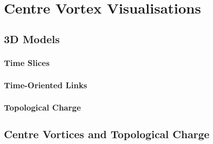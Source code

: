 
\chapter{Centre Vortex Visualisations}
\section{3D Models}
\subsection{Time Slices}
\subsection{Time-Oriented Links}
\subsection{Topological Charge}
\section{Centre Vortices and Topological Charge}

\ifpdf
    \graphicspath{{Chapter7/Figs/Raster/}{Chapter7/Figs/PDF/}{Chapter7/Figs/}}
\else
    \graphicspath{{Chapter7/Figs/Vector/}{Chapter7/Figs/}}
\fi
